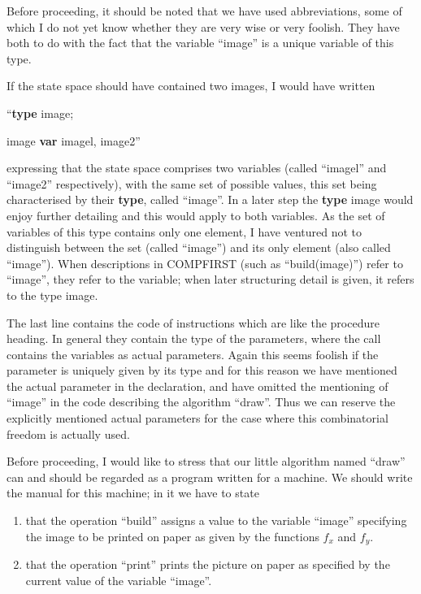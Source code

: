 \documentclass[twoside,11pt]{book}
\begin{document}
Before proceeding, it should be noted that we have used abbreviations, some of which I do not yet know whether they are very wise or very foolish. They have both to do with the fact that the variable ``image'' is a unique variable of this type.

If the state space should have contained two images, I would have written

\noindent
``\textbf{type} image;

\noindent
image \textbf{var} imagel, image2''

\noindent
expressing that the state space comprises two variables (called ``imagel'' and ``image2'' respectively), with the same set of possible values, this set being characterised by their \textbf{type}, called ``image''. In a later step the \textbf{type} image would enjoy further detailing and this would apply to both variables. As the set of variables of this type contains only one element, I have ventured not to distinguish between the set (called ``image'') and its only element (also called ``image''). When descriptions in COMPFIRST (such as ``build(image)'') refer to ``image'', they refer to the variable; when later structuring detail is given, it refers to the type image.

The last line contains the code of instructions which are like the procedure heading. In general they contain the type of the parameters, where the call contains the variables as actual parameters. Again this seems foolish if the parameter is uniquely given by its type and for this reason we have mentioned the actual parameter in the declaration, and have omitted the mentioning of ``image'' in the code describing the algorithm ``draw''. Thus we can reserve the explicitly mentioned actual parameters for the case where this combinatorial freedom is actually used.

Before proceeding, I would like to stress that our little algorithm named ``draw'' can and should be regarded as a program written for a machine. We should write the manual for this machine; in it we have to state 
\begin{enumerate}[wide, nosep, label=(\arabic*)]
	\item that the operation ``build'' assigns a value to the variable ``image'' specifying the image to be printed on paper as given by the functions $f_x$ and $f_y$.

	\item that the operation ``print'' prints the picture on paper as specified by the current value of the variable ``image''.
\end{enumerate}
\end{document}
